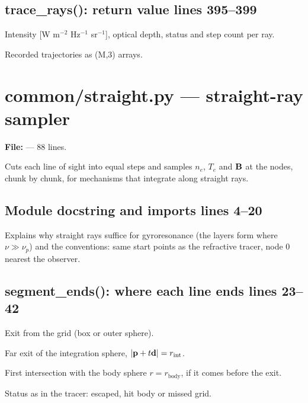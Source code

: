 \section*{\normalsize trace\_rays(): return value \hfill{\small\mdseries\color{gray}lines 395--399}}

\begin{lines}
\item[L.395] Intensity [W m$^{-2}$ Hz$^{-1}$ sr$^{-1}$], optical depth, status and step count per ray.
\item[L.396–398] Recorded trajectories as (M,3) arrays.
\end{lines}

\chapter{common/straight.py --- straight-ray sampler}
\label{mod:common:straight.py}
\textbf{File:}  --- 88 lines.

Cuts each line of sight into equal steps and samples $n_e$, $T_e$ and $\mathbf{B}$ at the
nodes, chunk by chunk, for mechanisms that integrate along straight rays.

\section*{\normalsize Module docstring and imports \hfill{\small\mdseries\color{gray}lines 4--20}}

Explains why straight rays suffice for gyroresonance (the layers form where $\nu\gg\nu_p$) and the conventions: same start points as the refractive tracer, node 0 nearest the observer.

\section*{\normalsize segment\_ends(): where each line ends \hfill{\small\mdseries\color{gray}lines 23--42}}

\begin{lines}
\item[L.28] Exit from the grid (box or outer sphere).
\item[L.32–34] Far exit of the integration sphere, $|\mathbf{p}+t\mathbf{d}|=r_\text{int}$.
\item[L.36–39] First intersection with the body sphere $r=r_\text{body}$, if it comes before the exit.
\item[L.41] Status as in the tracer: escaped, hit body or missed grid.
\end{lines}
